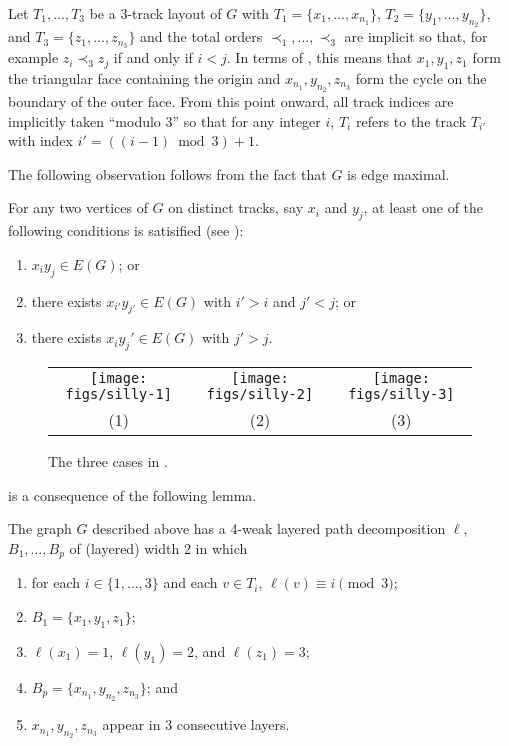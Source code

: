 \documentclass{patmorin}
\begin{document}
Let $T_1,\ldots,T_3$ be a 3-track layout of $G$ with
$T_1=\{x_1,\ldots,x_{n_1}\}$, $T_2=\{y_1,\ldots,y_{n_2}\}$, and
$T_3=\{z_1,\ldots,z_{n_3}\}$ and the total orders $\prec_1,\ldots,\prec_3$
are implicit so that, for example $z_i\prec_3 z_j$ if and only if $i<j$.
In terms of , this means that $x_1,y_1,z_1$ form
the triangular face containing the origin and $x_{n_1},y_{n_2},z_{n_3}$
form the cycle on the boundary of the outer face.
From this point onward, all track indices are implicitly taken ``modulo 3''
so that for any integer $i$, $T_i$ refers to the track $T_{i'}$ with
index $i'=((i-1)\bmod 3)+1$.  

The following observation follows from the fact that $G$ is edge maximal.
\begin{obs}
  For any two vertices of $G$ on distinct tracks, say $x_i$ and $y_j$, at least
  one of the following conditions is satisified (see ):
  \begin{enumerate}
    \item $x_iy_j\in E(G)$; or
    \item there exists $x_{i'}y_{j'} \in E(G)$ with $i'>i$ and $j'<j$; or
    \item there exists $x_iy_j'\in E(G)$ with $j'>j$.
  \end{enumerate}
\end{obs}

\begin{figure}
   \begin{center}
     \begin{tabular}{ccc}
       \texttt{[image: figs/silly-1]} &
       \texttt{[image: figs/silly-2]} &
       \texttt{[image: figs/silly-3]} \\
       (1) & (2) & (3) 
     \end{tabular}
   \end{center}
   \caption{The three cases in .}
\end{figure}

 is a consequence of the
following lemma.

\begin{lem}
  The graph $G$ described above has a 4-weak layered path decomposition
  $\ell$, $B_1,\ldots,B_p$ of (layered) width $2$ in which 
  \begin{enumerate}
    \item for each $i\in\{1,\ldots,3\}$ and each $v\in T_i$,
      $\ell(v)\equiv i\pmod 3$;
    \item $B_1=\{x_1,y_1,z_1\}$;
    \item $\ell(x_1)=1$, $\ell(y_1)=2$, and $\ell(z_1)=3$;
    \item $B_p=\{x_{n_1},y_{n_2},z_{n_3}\}$; and
    \item $x_{n_1},y_{n_2},z_{n_3}$ appear in 3 consecutive layers.
  \end{enumerate}
\end{lem}
\end{document}
